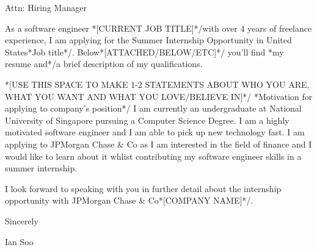 \documentclass[11pt]{article} %
\begin{document}
\begin{flushleft}

Attn: Hiring Manager %

\bigskip

As a software engineer \/*[CURRENT JOB TITLE]*/with over 4 years of freelance experience, I am applying for the Summer Internship Opportunity in United States\/*Job title*/. Below\/*[ATTACHED/BELOW/ETC]*/ you'll find \/*my resume and*/a brief description of my qualifications.

\medskip

\/*[USE THIS SPACE TO MAKE 1-2 STATEMENTS ABOUT WHO YOU ARE, WHAT YOU WANT AND WHAT YOU LOVE/BELIEVE IN]*/
\/*Motivation for applying to company's position*/
I am currently an undergraduate at National University of Singapore pursuing a Computer Science Degree. I am a highly motivated software engineer and I am able to pick up new technology fast.
I am applying to JPMorgan Chase \& Co as I am interested in the field of finance and I would like to learn about it whlist contributing my software engineer skills in a summer internship.

\medskip

I look forward to speaking with you in further detail about the internship opportunity with JPMorgan Chase \& Co\/*[COMPANY NAME]*/.

\bigskip

Sincerely

Ian Soo

\bigskip


\end{flushleft}
\end{document}
